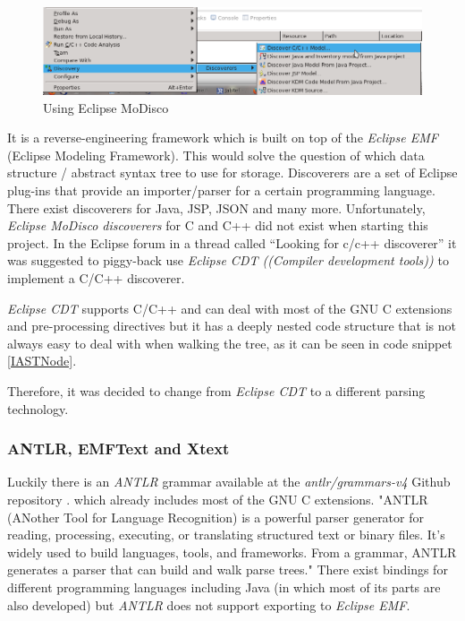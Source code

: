 \begin{figure}[ht]
    \centering
	\includegraphics[scale=0.35]{images/discoverer}
	\caption{Using Eclipse MoDisco}
    \label{fig:discoverer}
\end{figure}
\FloatBarrier

It is a reverse-engineering framework which is built on top of the
{\it Eclipse EMF} (Eclipse Modeling Framework).
This would solve the question of which data structure / abstract syntax tree
to use for storage.
Discoverers are a set of Eclipse plug-ins that provide an importer/parser for a 
certain programming language.
There exist discoverers for Java, JSP, JSON and many more.
Unfortunately, {\it Eclipse MoDisco discoverers} for C and C++ 
did not exist when starting this project.
In the Eclipse forum in a thread called ``Looking for c/c++ discoverer''
\cite{C_Discoverer} it was suggested to piggy-back use 
{\it Eclipse CDT ((Compiler development tools))}
\cite{Eclipse_CDT}\cite{piatov2012using} to implement a C/C++ discoverer.

{\it Eclipse CDT} supports C/C++ and can deal with most of the GNU C extensions
and pre-processing directives but it has 
a deeply nested code structure that is not always easy to deal with when 
walking the tree, as it can be seen in code snippet \ref{IASTNode}.



Therefore, it was decided to change from {\it Eclipse CDT} to a different parsing 
technology. 

\subsubsection{ANTLR, EMFText and Xtext}
Luckily there is an {\it ANTLR} grammar available 
at the {\it antlr/grammars-v4} Github repository \cite{C_v4}.
which already includes
most of the GNU C extensions. 
"ANTLR (ANother Tool for Language Recognition)
is a powerful parser generator for reading, processing, executing, 
or translating structured text or binary files.
 It's widely used to build languages, tools, and frameworks. 
 From a grammar, 
 ANTLR generates a parser that can build and walk parse trees."\cite{Antlr}
There exist bindings for different programming languages including Java
(in which most of its parts are also developed) but {\it ANTLR} does not
support exporting to {\it Eclipse EMF}.


